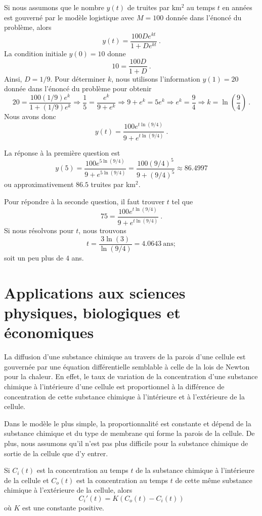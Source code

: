 {\begin{egg}
Si nous assumons que le nombre $y(t)$ de truites par km$^2$ au temps $t$
en années est gouverné par le modèle logistique avec $M=100$ donnée dans
l'énoncé du problème, alors
\[
y(t) = \frac{100 D e^{kt}}{1+D e^{kt}} \ .
\]
La condition initiale $y(0)=10$ donne
\[
10 = \frac{100 D}{1+D} \ .
\]
Ainsi, $D = 1/9$.  Pour déterminer $k$, nous utilisons l'information
$y(1) = 20$ donnée dans l'énoncé du problème pour obtenir
\[
20 = \frac{100 (1/9) e^{k}}{1+ (1/9)e^{k}}
\Rightarrow \frac{1}{5} = \frac{e^{k}}{9+e^{k}}
\Rightarrow 9 + e^{k} = 5 e^{k}
\Rightarrow e^{k} = \frac{9}{4}
\Rightarrow k = \ln\left(\frac{9}{4}\right) \ .
\]
Nous avons donc
\[
 y(t) = \frac{100 e^{t\ln(9/4)}}{9+e^{t\ln(9/4)}} \ .
\]

La réponse à la première question est
\[
y(5) = \frac{100 e^{5\ln(9/4)}}{9+e^{5\ln(9/4)}} =
\frac{100 (9/4)^{5}}{9 + (9/4)^{5}} \approx 86.4997
\]
ou approximativement $86.5$ truites par km$^2$.

Pour répondre à la seconde question, il faut trouver $t$ tel que
\[
75 = \frac{100 e^{t\ln(9/4)}}{9+e^{t\ln(9/4)}} \ .
\]
Si nous résolvons pour $t$, nous trouvons
\[
t= \frac{ 3\ln(3)}{\ln(9/4)} = 4.0643\ \text{ans};
\]
soit un peu plus de $4$ ans.
\end{egg}

\section{Applications aux sciences physiques, biologiques et
économiques}

\begin{egg}[\life]
La diffusion d'une substance chimique au travers de la parois d'une
cellule est gouvernée par une équation différentielle semblable à
celle de la lois de Newton pour la chaleur.  En effet, le taux de
variation de la concentration d'une substance chimique à l'intérieure
d'une cellule est proportionnel à la différence de concentration de
cette substance chimique à l'intérieure et à l'extérieure de la
cellule.

Dans le modèle le plus simple, la proportionnalité est constante et
dépend de la substance chimique et du type de membrane qui forme la
parois de la cellule.  De plus, nous assumons qu'il n'est pas plus
difficile pour la substance chimique de sortie de la cellule que d'y
entrer.

Si $C_i(t)$ est la concentration au temps $t$ de la substance chimique
à l'intérieure de la cellule et $C_o(t)$ est la concentration au temps
$t$ de cette même substance chimique à l'extérieure de la cellule,
alors
\[
C_i'(t) = K(C_o(t) - C_i(t))
\]
où $K$ est une constante positive.


\end{egg}}

